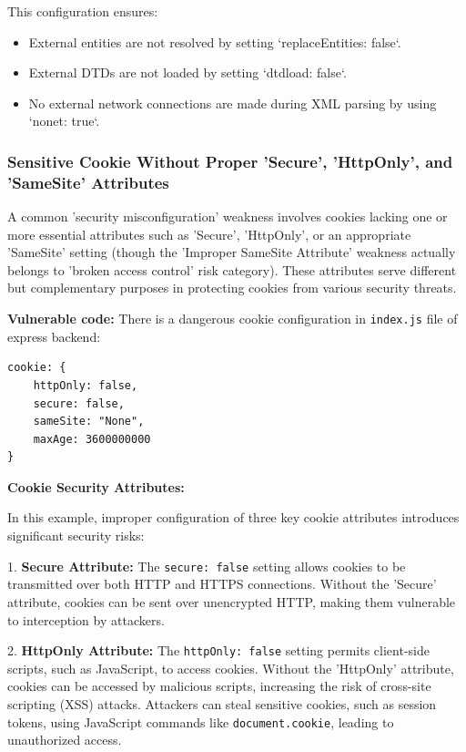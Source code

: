 \documentclass[]{article}
\begin{document}
This configuration ensures:
\begin{itemize}
    \item External entities are not resolved by setting `replaceEntities: false`.
    \item External DTDs are not loaded by setting `dtdload: false`.
    \item No external network connections are made during XML parsing by using `nonet: true`.
\end{itemize}

\subsubsection{Sensitive Cookie Without Proper 'Secure', 'HttpOnly', and 'SameSite' Attributes}
\label{subsubsec:sensitive_cookie_without_secure_and_httponly_attributes}

A common 'security misconfiguration' weakness involves cookies lacking one or more essential attributes such as 'Secure', 'HttpOnly', or an appropriate 'SameSite' setting (though the 'Improper SameSite Attribute' weakness actually belongs to 'broken access control' risk category). These attributes serve different but complementary purposes in protecting cookies from various security threats.

\textbf{Vulnerable code:}
There is a dangerous cookie configuration in \texttt{index.js} file of express backend:

\begin{lstlisting}
cookie: {
    httpOnly: false,
    secure: false,
    sameSite: "None",
    maxAge: 3600000000
}
\end{lstlisting}

\textbf{Cookie Security Attributes:}

In this example, improper configuration of three key cookie attributes introduces significant security risks:

1. \textbf{Secure Attribute:}
   The \texttt{secure: false} setting allows cookies to be transmitted over both HTTP and HTTPS connections. Without the 'Secure' attribute, cookies can be sent over unencrypted HTTP, making them vulnerable to interception by attackers.

2. \textbf{HttpOnly Attribute:} 
   The \texttt{httpOnly: false} setting permits client-side scripts, such as JavaScript, to access cookies. Without the 'HttpOnly' attribute, cookies can be accessed by malicious scripts, increasing the risk of cross-site scripting (XSS) attacks. Attackers can steal sensitive cookies, such as session tokens, using JavaScript commands like \texttt{document.cookie}, leading to unauthorized access.
\end{document}
